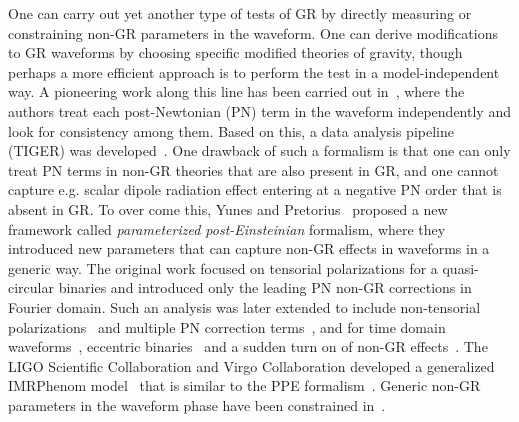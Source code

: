 \documentclass[prd,twocolumn,nofootinbib]{revtex4-1}
\begin{document}
One can carry out yet another type of tests of GR by directly measuring or constraining non-GR parameters in the waveform. One can derive modifications to GR waveforms by choosing specific modified theories of gravity, though perhaps a more efficient approach is to perform the test in a model-independent way. A pioneering work along this line has been carried out in~\cite{Arun:2006yw,Arun:2006hn,Mishra:2010tp}, where the authors treat each post-Newtonian (PN) term in the waveform independently and look for consistency among them. Based on this, a data analysis pipeline (TIGER) was developed~\cite{Agathos:2013upa,Meidam:2014jpa}. One drawback of such a formalism is that one can only treat PN terms in non-GR theories that are also present in GR, and one cannot capture e.g. scalar dipole radiation effect entering at a negative PN order that is absent in GR. To over come this, Yunes and Pretorius~\cite{Yunes:2009ke} proposed a new framework called \emph{parameterized post-Einsteinian} formalism, where they introduced new parameters that can capture non-GR effects in waveforms in a generic way. The original work focused on tensorial polarizations for a quasi-circular binaries and introduced only the leading PN non-GR corrections in Fourier domain. Such an analysis was later extended to include non-tensorial polarizations~\cite{Chatziioannou:2012rf} and multiple PN correction terms~\cite{Sampson:2013lpa}, and for time domain waveforms~\cite{Huwyler:2014gaa}, eccentric binaries~\cite{Loutrel:2014vja} and a sudden turn on of non-GR effects~\cite{Sampson:2013jpa,Sampson:2014qqa}. The LIGO Scientific Collaboration and Virgo Collaboration developed a generalized IMRPhenom model~\cite{Monitor:2017mdv} that is similar to the PPE formalism~\cite{Yunes:2016jcc}. Generic non-GR parameters in the waveform phase have been constrained in~\cite{Monitor:2017mdv,TheLIGOScientific:2016pea,Yunes:2016jcc,Abbott:2017vtc}. 



\end{document}
